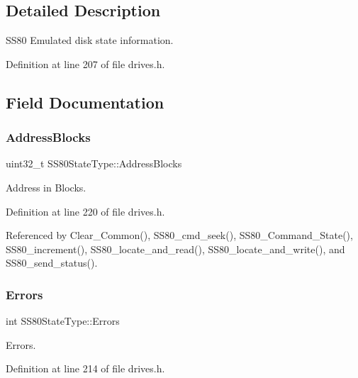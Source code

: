 \subsection{Detailed Description}
S\+S80 Emulated disk state information. 

Definition at line 207 of file drives.\+h.



\subsection{Field Documentation}
\mbox{\label{structSS80StateType_a6cffa1e36a57bce4188ede4bd9dbd7ad}} 
\subsubsection{\texorpdfstring{Address\+Blocks}{AddressBlocks}}
{\footnotesize\ttfamily uint32\+\_\+t S\+S80\+State\+Type\+::\+Address\+Blocks}



Address in Blocks. 



Definition at line 220 of file drives.\+h.



Referenced by Clear\+\_\+\+Common(), S\+S80\+\_\+cmd\+\_\+seek(), S\+S80\+\_\+\+Command\+\_\+\+State(), S\+S80\+\_\+increment(), S\+S80\+\_\+locate\+\_\+and\+\_\+read(), S\+S80\+\_\+locate\+\_\+and\+\_\+write(), and S\+S80\+\_\+send\+\_\+status().

\mbox{\label{structSS80StateType_a7a5c363c6f617ee457a4daacadb3a7b2}} 
\subsubsection{\texorpdfstring{Errors}{Errors}}
{\footnotesize\ttfamily int S\+S80\+State\+Type\+::\+Errors}



Errors. 



Definition at line 214 of file drives.\+h.




